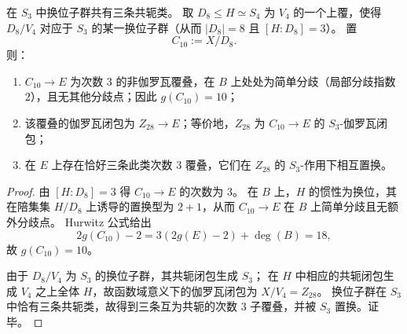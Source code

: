 \begin{conclusion}\label{con:xi-terminal-zm-delta-three-cubic-subcovers-s3-closure}
在 \(S_3\) 中换位子群共有三条共轭类。
取 \(D_8\le H\simeq S_4\) 为 \(V_4\) 的一个上覆，使得 \(D_8/V_4\) 对应于 \(S_3\) 的某一换位子群（从而 \(|D_8|=8\) 且 \([H:D_8]=3\)）。
置
\[
C_{10}:=X/D_8.
\]
则：
\begin{enumerate}
  \item \(C_{10}\to E\) 为次数 \(3\) 的非伽罗瓦覆叠，在 \(B\) 上处处为简单分歧（局部分歧指数 \(2\)），且无其他分歧点；因此 \(g(C_{10})=10\)；
  \item 该覆叠的伽罗瓦闭包为 \(Z_{28}\to E\)；等价地，\(Z_{28}\) 为 \(C_{10}\to E\) 的 \(S_3\)-伽罗瓦闭包；
  \item 在 \(E\) 上存在恰好三条此类次数 \(3\) 覆叠，它们在 \(Z_{28}\) 的 \(S_3\)-作用下相互置换。
\end{enumerate}
\end{conclusion}
\begin{proof}
由 \([H:D_8]=3\) 得 \(C_{10}\to E\) 的次数为 \(3\)。
在 \(B\) 上，\(H\) 的惯性为换位，其在陪集集 \(H/D_8\) 上诱导的置换型为 \(2+1\)，从而 \(C_{10}\to E\) 在 \(B\) 上简单分歧且无额外分歧点。
Hurwitz 公式给出
\[
2g(C_{10})-2=3(2g(E)-2)+\deg(B)=18,
\]
故 \(g(C_{10})=10\)。
\par
由于 \(D_8/V_4\) 为 \(S_3\) 的换位子群，其共轭闭包生成 \(S_3\)；
在 \(H\) 中相应的共轭闭包生成 \(V_4\) 之上全体 \(H\)，故函数域意义下的伽罗瓦闭包为 \(X/V_4=Z_{28}\)。
换位子群在 \(S_3\) 中恰有三条共轭类，故得到三条互为共轭的次数 \(3\) 子覆叠，并被 \(S_3\) 置换。证毕。
\end{proof}

